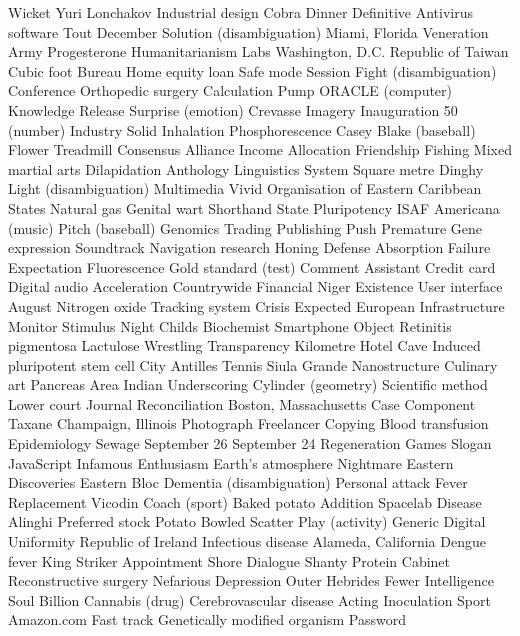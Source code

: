 Wicket  Yuri Lonchakov  Industrial design  
Cobra  Dinner  Definitive  
Antivirus software  Tout  December  
Solution (disambiguation)  Miami, Florida  Veneration  
Army  Progesterone  Humanitarianism  
Labs  Washington, D.C.  Republic of Taiwan  
Cubic foot  Bureau  Home equity loan  
Safe mode  Session  Fight (disambiguation)  
Conference  Orthopedic surgery  Calculation  
Pump  ORACLE (computer)  Knowledge  
Release  Surprise (emotion)  Crevasse  
Imagery  Inauguration  50 (number)  
Industry  Solid  Inhalation  
Phosphorescence  Casey Blake (baseball)  Flower  
Treadmill  Consensus  Alliance  
Income  Allocation  Friendship  
Fishing  Mixed martial arts  Dilapidation  
Anthology  Linguistics  System  
Square metre  Dinghy  Light (disambiguation)  
Multimedia  Vivid  Organisation of Eastern Caribbean States  
Natural gas  Genital wart  Shorthand  
State  Pluripotency  ISAF  
Americana (music)  Pitch (baseball)  Genomics  
Trading  Publishing  Push  
Premature  Gene expression  Soundtrack  
Navigation research  Honing  Defense  
Absorption  Failure  Expectation  
Fluorescence  Gold standard (test)  Comment  
Assistant  Credit card  Digital audio  
Acceleration  Countrywide Financial  Niger  
Existence  User interface  August  
Nitrogen oxide  Tracking system  Crisis  
Expected  European  Infrastructure  
Monitor  Stimulus  Night  
Childs  Biochemist  Smartphone  
Object  Retinitis pigmentosa  Lactulose  
Wrestling  Transparency  Kilometre  
Hotel  Cave  Induced pluripotent stem cell  
City  Antilles  Tennis  
Siula Grande  Nanostructure  Culinary art  
Pancreas  Area  Indian  
Underscoring  Cylinder (geometry)  Scientific method  
Lower court  Journal  Reconciliation  
Boston, Massachusetts  Case  Component  
Taxane  Champaign, Illinois  Photograph  
Freelancer  Copying  Blood transfusion  
Epidemiology  Sewage  September 26  
September 24  Regeneration  Games  
Slogan  JavaScript  Infamous  
Enthusiasm  Earth's atmosphere  Nightmare  
Eastern  Discoveries  Eastern Bloc  
Dementia (disambiguation)  Personal attack  Fever  
Replacement  Vicodin  Coach (sport)  
Baked potato  Addition  Spacelab  
Disease  Alinghi  Preferred stock  
Potato  Bowled  Scatter  
Play (activity)  Generic  Digital  
Uniformity  Republic of Ireland  Infectious disease  
Alameda, California  Dengue fever  King  
Striker  Appointment  Shore  
Dialogue  Shanty  Protein  
Cabinet  Reconstructive surgery  Nefarious  
Depression  Outer Hebrides  Fewer  
Intelligence  Soul  Billion  
Cannabis (drug)  Cerebrovascular disease  Acting  
Inoculation  Sport  Amazon.com  
Fast track  Genetically modified organism  Password  
